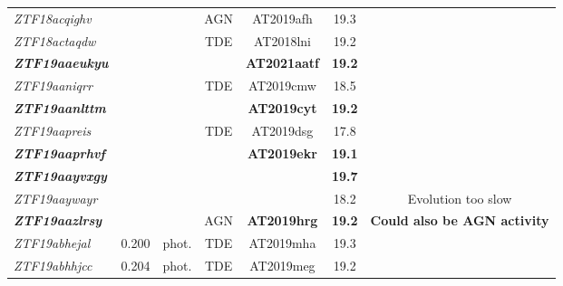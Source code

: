 \begin{table*}
\begin{tabular}{l  c  c  c   c  c  c}
    \textit{ZTF18acqighv}          & ~              & ~              & AGN                     & AT2019afh           & 19.3                       &                                     \\
    \textit{ZTF18actaqdw}          & ~              & ~              & TDE                     & AT2018lni           & 19.2                       &                                     \\
    \textbf{\textit{ZTF19aaeukyu}} & ~              & ~              & ~                       & \textbf{AT2021aatf} & \textbf{19.2}              &                                     \\
    \textit{ZTF19aaniqrr}          & ~              & ~              & TDE                     & AT2019cmw           & 18.5                       &                                     \\
    \textbf{\textit{ZTF19aanlttm}} & ~              & ~              & ~                       & \textbf{AT2019cyt}  & \textbf{19.2}              &                                     \\
    \textit{ZTF19aapreis}          & ~              & ~              & TDE                     & AT2019dsg           & 17.8                       &                                     \\
    \textbf{\textit{ZTF19aaprhvf}} & ~              & ~              & ~                       & \textbf{AT2019ekr}  & \textbf{19.1}              &                                     \\
    \textbf{\textit{ZTF19aayvxgy}} & ~              & ~              & ~                       & ~                   & \textbf{19.7}              &                                     \\
    \textit{ZTF19aaywayr}          & ~              & ~              & ~                       & ~                   & 18.2                       & Evolution too slow                  \\
    \textbf{\textit{ZTF19aazlrsy}} & ~              & ~              & AGN                     & \textbf{AT2019hrg}  & \textbf{ 19.2}             & \textbf{Could also be AGN activity} \\
    \textit{ZTF19abhejal}          & 0.200          & phot.          & TDE                     & AT2019mha           & 19.3                       &                                     \\
    \textit{ZTF19abhhjcc}          & 0.204          & phot.          & TDE                     & AT2019meg           & 19.2                       &                                     \\

\end{tabular}
\end{table*}
